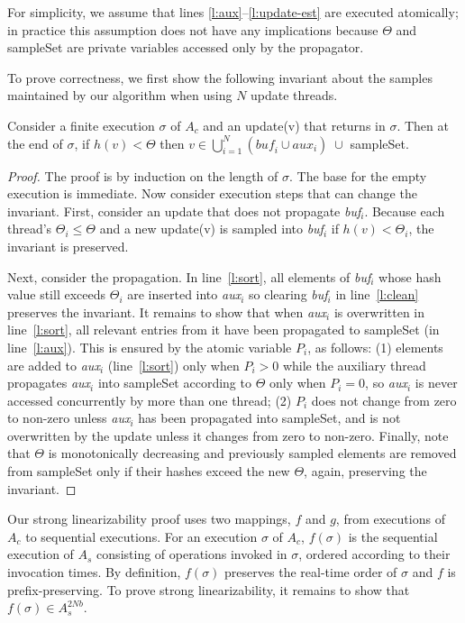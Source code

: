 For simplicity, we assume that lines  \ref{l:aux}--\ref{l:update-est} are executed atomically; 
in practice this assumption does not have any implications because $\Theta$ and sampleSet 
are private variables accessed only by the propagator.  

To prove correctness, we first show the following invariant about the samples maintained by 
our algorithm when using $N$ update threads.
\begin{invariant}[Sampling]
Consider a finite execution $\sigma$ of  $A_c$ and an update(v) that returns in $\sigma$. 
Then  at the end of $\sigma$,  if $h(v) < \Theta$ then 
$v\in \bigcup_{i=1}^N (\mathit{buf_i} \cup \mathit{aux_i}) \; \cup$ sampleSet.
\label{invariant:sampling}
\end{invariant}

\begin{proof}
The proof is by induction on the length of $\sigma$. The base for the empty execution is immediate. 
Now consider execution steps that can change the invariant.
First, consider an update that does not propagate \emph{buf$_i$}. 
Because each thread's $\Theta_i \le \Theta$ and a new update(v)  is sampled into \emph{buf$_i$} if 
$h(v) < \Theta_i$, the invariant is preserved.

Next, consider the propagation. 
In line~\ref{l:sort},  all elements of  \emph{buf$_i$}
whose hash value still exceeds $\Theta_i$ are inserted into \emph{aux$_i$} 
so clearing \emph{buf$_i$} in line~\ref{l:clean} preserves the invariant. 
It remains to show that when  \emph{aux$_i$} is overwritten in line~\ref{l:sort},
 all relevant entries from it have been propagated to  sampleSet (in line~\ref{l:aux}).
This is ensured by the atomic variable $P_i$, as follows:
(1) elements are added to \emph{aux$_i$} (line~\ref{l:sort}) only when $P_i >0$ while 
 the auxiliary thread propagates \emph{aux$_i$} into sampleSet according to $\Theta$ only when $P_i =0$,
 so \emph{aux$_i$} is never accessed concurrently by more than one thread;
(2) $P_i$ does not change from zero to non-zero unless  \emph{aux$_i$} has been propagated into sampleSet,
and is not overwritten by the update unless it changes from zero to non-zero. 
Finally, note that $\Theta$ is monotonically decreasing and previously sampled elements are removed from sampleSet only if their hashes exceed the new $\Theta$, again, preserving the invariant.
\end{proof}

Our strong linearizability proof uses two mappings,
$f$ and $g$,  from executions of $A_c$ to sequential executions. 
%
For an execution $\sigma$ of $A_c$,  $f(\sigma)$ is the sequential execution of $A_s$
consisting of  
operations invoked in $\sigma$,  ordered according to their invocation times. 
By definition, $f(\sigma)$ preserves the real-time order of $\sigma$ and $f$  is prefix-preserving.
To prove strong linearizability, it remains to show that $f(\sigma) \in A^{2Nb}_s$.

